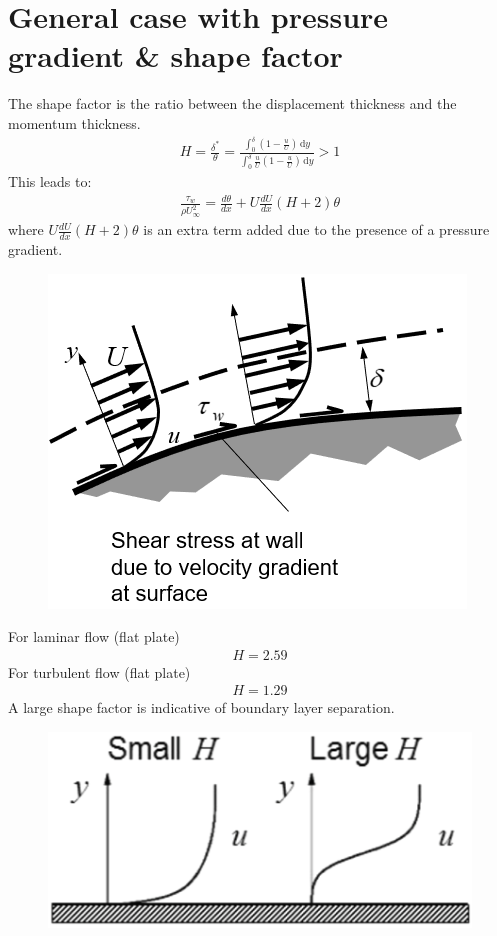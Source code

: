 \documentclass[class=report, crop=false, 12pt,a4paper]{standalone}
\begin{document}
\section{General case with pressure gradient \& shape factor}
The shape factor is the ratio between the displacement thickness and the momentum thickness.
\begin{align}
  H = \frac{\delta^*}{\theta} = \frac{\int_{0}^{\delta} \left(1 - \frac{u}{U}\right) \,\mathrm{d}y}{\int_{0}^{\delta} \frac{u}{U} \left(1 - \frac{u}{U}\right) \,\mathrm{d}y} > 1
\end{align}
This leads to:
\begin{align}
  \frac{\tau_w}{\rho U_\infty^2} = \frac{d\theta}{dx} + U \frac{dU}{dx} (H + 2)\theta
\end{align}
where $U \frac{dU}{dx} (H + 2)\theta$ is an extra term added due to the presence of a pressure gradient. 
\begin{figure}[H]
  \centering
  \includegraphics[width = 0.5 \textwidth]{../img/diagram74.png}
  \caption{}
\end{figure}
For laminar flow (flat plate)
\begin{align}
  H = 2.59
\end{align}
For turbulent flow (flat plate)
\begin{align}
  H = 1.29
\end{align}
A large shape factor is indicative of boundary layer separation.
\begin{figure}[H]
  \centering
  \includegraphics[width = 0.5 \textwidth]{../img/diagram75.png}
  \caption{}
\end{figure}
\end{document}
